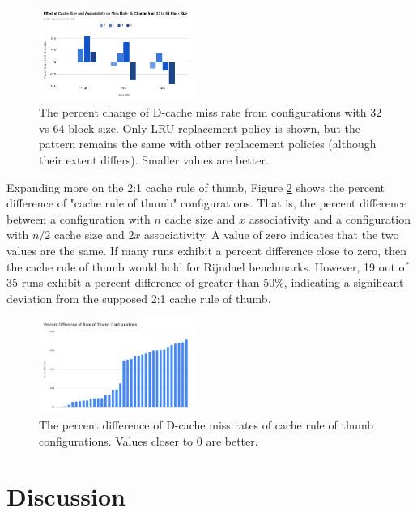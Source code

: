 \documentclass[conference]{IEEEtran}
\begin{document}
\begin{figure}[H]
  \centering
  \includegraphics[width=0.45\textwidth]{images/rijndael_missrate_percentchange.png}
  \caption{The percent change of D-cache miss rate from configurations with 32 vs 64 block size. Only LRU replacement policy is shown, but the pattern remains the same with other replacement policies (although their extent differs). Smaller values are better.}
  \label{fig:rijndael-missrate-percentchange}
\end{figure}

Expanding more on the 2:1 cache rule of thumb, Figure \ref{fig:rijndael-percentdifference} shows the percent difference of "cache rule of thumb" configurations. That is, the percent difference between a configuration with $n$ cache size and $x$ associativity and a configuration with $n/2$ cache size and $2x$ associativity. A value of zero indicates that the two values are the same. If many runs exhibit a percent difference close to zero, then the cache rule of thumb would hold for Rijndael benchmarks. However, 19 out of 35 runs exhibit a percent difference of greater than 50\%, indicating a significant deviation from the supposed 2:1 cache rule of thumb.

\begin{figure}[H]
  \centering
  \includegraphics[width=0.45\textwidth]{images/rijndael_percentdifference.png}
  \caption{The percent difference of D-cache miss rates of cache rule of thumb configurations. Values closer to 0 are better.}
  \label{fig:rijndael-percentdifference}
\end{figure}

\section{Discussion}
\end{document}
